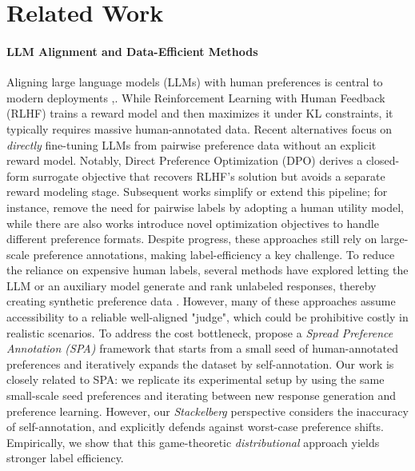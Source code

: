 \section{Related Work}
\label{sec:relatedwork}
\paragraph{LLM Alignment and Data-Efficient Methods}
Aligning large language models (LLMs) with human preferences is central to modern deployments
\citep{Ziegler2019Fine,Ouyang2022Training,Bai2022Training},.
While Reinforcement Learning with Human Feedback (RLHF) \citep{Christiano2017Deep} trains a reward model and then maximizes it under KL constraints, it typically requires massive human-annotated data. Recent alternatives focus on \emph{directly} fine-tuning LLMs from pairwise preference data without an explicit reward model. 
Notably, Direct Preference Optimization (DPO) \citep{Rafailov2023Direct}
derives a closed-form surrogate objective that recovers RLHF’s solution 
but avoids a separate reward modeling stage. Subsequent works simplify or extend this pipeline; for instance, \citet{Ethayarajh2024KTO} remove the need for pairwise labels by adopting a human utility model, 
while there are also works \citep{Meng2024Simpo,Hong2024ORPO,Azar2024General} introduce novel optimization objectives  to handle different preference formats. 
Despite progress, these approaches still rely on large-scale preference annotations, making label-efficiency a key challenge. To reduce the reliance on expensive human labels, several methods have explored letting the LLM or an auxiliary model 
generate and rank unlabeled responses, thereby creating synthetic preference data \citep{Jiang2023LLM,Yuan2024Self,Xiong2024Iterative,Kim2025Spread}. 
However, many of these approaches assume accessibility to a reliable well-aligned "judge", which could be prohibitive costly in realistic scenarios. To address the cost bottleneck, \citet{Kim2025Spread} propose a \emph{Spread Preference Annotation (SPA)} framework that starts from a small seed of human-annotated preferences and iteratively expands the dataset by self-annotation. Our work is closely related to SPA: we replicate its experimental setup by using the same small-scale seed preferences and iterating between new response generation and preference learning. 
However, our \emph{Stackelberg} perspective considers the inaccuracy of self-annotation, and explicitly defends against worst-case preference shifts. Empirically, we show that this game-theoretic \emph{distributional} approach yields stronger label efficiency.

